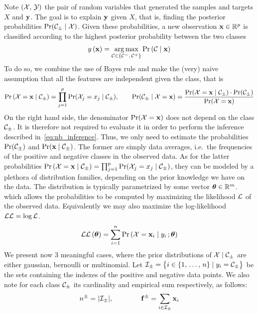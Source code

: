 Note $\left( \mathcal{X},\, \mathcal{Y} \right)$ the pair of random variables that generated the samples and targets $X$ and $\mathbf{y}$.
The goal is to explain $\mathbf{y}$ given $X$, that is, finding the posterior probabilities $\Pr(\mathcal{C}_\pm \mid \mathcal{X})$.
Given these probabilities, a new observation $\mathbf{x} \in \mathbb{R}^p$ is classified according to the highest
posterior probability between the two classes
\begin{equation}\label{eq:nb_inference}
y\left( \mathbf{x} \right) = \underset{\mathcal{C} \in \left\{ \mathcal{C}^-,\, \mathcal{C}^+ \right\}}{\operatorname*{arg\,max}} \Pr\left( \mathcal{C} \mid \mathbf{x} \right)
\end{equation}
To do so, we combine the use of Bayes rule and make the (very) naive assumption that
all the features are independent given the class, that is
\begin{equation}
    \Pr\left( \mathcal{X} = \mathbf{x} \mid \mathcal{C}_\pm \right) = \prod_{j = 1}^p \Pr(\mathcal{X}_j = x_j \mid \mathcal{C}_\pm)
    ,\qquad
    \Pr(\mathcal{C}_\pm \mid \mathcal{X} = \mathbf{x}) = \frac{\Pr(\mathcal{X} = \mathbf{x} \mid \mathcal{C}_\pm) \cdot \Pr(\mathcal{C}_\pm)}{\Pr(\mathcal{X} = \mathbf{x})}
\end{equation}
On the right hand side,
the denominator $\Pr(\mathcal{X} = \mathbf{x})$ does not depend on the class $\mathcal{C}_\pm$.
It is therefore not required to evaluate it in order to perform the inference described in~\ref{eq:nb_inference}.
Thus, we only need to estimate the probabilities $\Pr(\mathcal{C}_\pm)$ and $\Pr(\mathbf{x} \mid \mathcal{C}_\pm)$.
The former are simply data averages, i.e.\ the frequencies of the positive and negative classes in the observed data.
As for the latter probabilities
$\Pr\left( \mathcal{X} = \mathbf{x} \mid \mathcal{C}_\pm \right) = \prod_{j = 1}^p \Pr(\mathcal{X}_j = x_j \mid \mathcal{C}_\pm)$,
they can be modeled by a plethora of distribution families, depending on the prior knowledge we have on the data.
The distribution is typically parametrized by some vector $\bm{\theta} \in \mathbb{R}^m$.
which allows the probabilities to be computed by maximizing the likelihood $\mathcal{L}$ of the observed data.
Equivalently we may also maximize the log-likelihood $\mathcal{L}\mathcal{L} = \log\mathcal{L}$.
\begin{equation*}
    \mathcal{L}\mathcal{L}\left( \bm{\theta} \right) = \sum_{i = 1}^n \Pr\left( \mathcal{X} = \mathbf{x}_i \mid y_i \,; \bm{\theta} \right)
\end{equation*}
We present now 3 meaningful cases, where the prior distributions of $\mathcal{X} \mid \mathcal{C}_\pm$ are either
gaussian, bernoulli or multinomial.
Let $\mathcal{I}_\pm = \big\{ i \in \left\{ 1,\, \dots,\, n \right\} \mid y_i = \mathcal{C}_\pm \big\}$ be the sets containing the
indexes of the positive and negative data points.
We also note for each class $\mathcal{C}_\pm$ its cardinality and empirical sum respectively, as follows:
\begin{equation*}
    n^\pm = | \mathcal{I}_\pm |,
    \qquad\qquad
    \mathbf{f}^\pm = \sum_{i \in \mathcal{I}_\pm} \mathbf{x}_i
\end{equation*}

